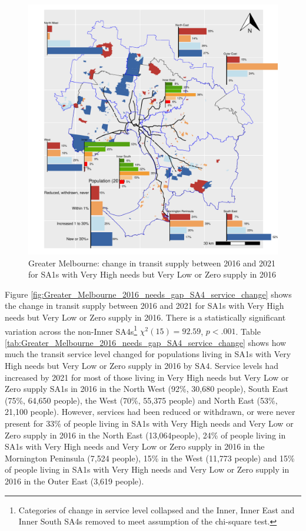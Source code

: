 \documentclass[preprint, 3p,
authoryear]{elsarticle} %
\begin{document}
\begin{figure}
\centering
\includegraphics{ReynoldsCurrieQu2024_files/figure-latex/Greater_Melbourne_2016_needs_gap_SA4_service_change-1.pdf}
\caption{Greater Melbourne: change in transit supply between 2016 and
2021 for SA1s with Very High needs but Very Low or Zero supply in 2016}
\end{figure}

Figure \ref{fig:Greater_Melbourne_2016_needs_gap_SA4_service_change}
shows the change in transit supply between 2016 and 2021 for SA1s with
Very High needs but Very Low or Zero supply in 2016. There is a
statistically significant variation across the non-Inner SA4s\footnote{Categories
  of change in service level collapsed and the Inner, Inner East and
  Inner South SA4s removed to meet assumption of the chi-square test.}
\(\chi^2(15) = 92.59\), \(p < .001\). Table
\ref{tab:Greater_Melbourne_2016_needs_gap_SA4_service_change} shows how
much the transit service level changed for populations living in SA1s
with Very High needs but Very Low or Zero supply in 2016 by SA4. Service
levels had increased by 2021 for most of those living in Very High needs
but Very Low or Zero supply SA1s in 2016 in the North West (92\%, 30,680
people), South East (75\%, 64,650 people), the West (70\%, 55,375
people) and North East (53\%, 21,100 people). However, services had been
reduced or withdrawn, or were never present for 33\% of people living in
SA1s with Very High needs and Very Low or Zero supply in 2016 in the
North East (13,064people), 24\% of people living in SA1s with Very High
needs and Very Low or Zero supply in 2016 in the Mornington Peninsula
(7,524 people), 15\% in the West (11,773 people) and 15\% of people
living in SA1s with Very High needs and Very Low or Zero supply in 2016
in the Outer East (3,619 people).
\end{document}

